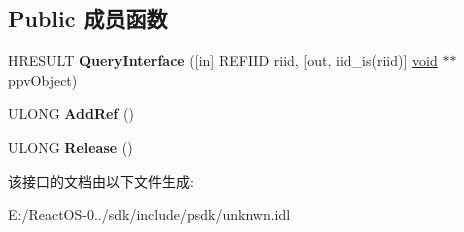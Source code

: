 \subsection*{Public 成员函数}
\begin{DoxyCompactItemize}
\item 
\mbox{\label{interface_i_unknown_ad935cefb1fdf125d9000baf43e435ed1}} 
H\+R\+E\+S\+U\+LT {\bfseries Query\+Interface} (\mbox{[}in\mbox{]} R\+E\+F\+I\+ID riid, \mbox{[}out, iid\+\_\+is(riid)\mbox{]} \hyperlink{interfacevoid}{void} $\ast$$\ast$ppv\+Object)
\item 
\mbox{\label{interface_i_unknown_a1218106146984403b77b2f67254685f8}} 
U\+L\+O\+NG {\bfseries Add\+Ref} ()
\item 
\mbox{\label{interface_i_unknown_af77dbe96fba78b12d9194661469a6e0e}} 
U\+L\+O\+NG {\bfseries Release} ()
\end{DoxyCompactItemize}


该接口的文档由以下文件生成\+:\begin{DoxyCompactItemize}
\item 
E\+:/\+React\+O\+S-\/0../sdk/include/psdk/unknwn.\+idl\end{DoxyCompactItemize}
